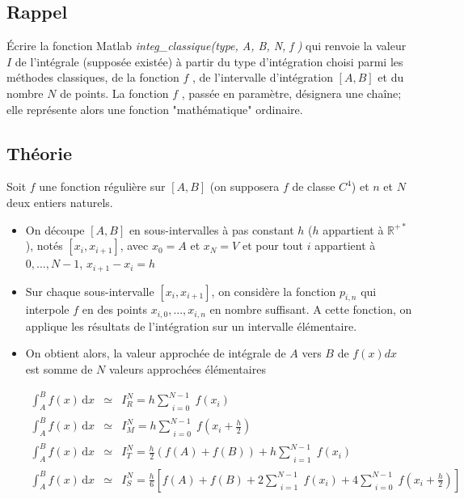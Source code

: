 \documentclass[a4paper,10pt]{report}
\newcommand{\R}{\mathbb{R}}
\begin{document}
\subsection*{Rappel}

Écrire la fonction Matlab \textit{integ\_classique(type, A, B, N, f )} qui renvoie la valeur $I$ de l’intégrale (supposée existée) à partir du type d’intégration choisi parmi les méthodes classiques, de la fonction $f$ , de l’intervalle d’intégration $[A, B]$ et du nombre $N$ de points. La fonction $f$ , passée en paramètre, désignera une chaîne; elle représente alors une fonction "mathématique" ordinaire.

\subsection*{Théorie}

Soit $f$ une fonction régulière sur $[A, B]$ (on supposera $f$ de classe $C^{4}$) et $n$ et $N$ deux entiers naturels.

\begin{itemize}
\item On découpe $[A, B]$ en sous-intervalles à pas constant $h$ ($h$ appartient à $\R^{+*}$), notés $[x_i, x_{i+1}]$, avec $x_0 = A$ et $x_N = V$ et pour tout $i$ appartient à ${0,...,N-1}$, $x_{i+1}-x_i = h$
\item Sur chaque sous-intervalle $[x_i, x_{i+1}]$, on considère la fonction $p_{i,n}$ qui interpole $f$ en des points ${x_{i,0} ,..., x_{i,n}}$ en nombre suffisant. A cette fonction, on applique les résultats de l’intégration sur un intervalle élémentaire.

\item On obtient alors, la valeur approchée de intégrale de $A$ vers $B$ de $f(x) dx$  est somme de $N$ valeurs approchées élémentaires

\begin{eqnarray}
\int_{A}^{B} f(x) \, \mathrm{d}x &\simeq& I^{N}_{R} = h \sum_{\substack{i=0}}^{N-1} f \left(x_i\right)\\
\int_{A}^{B} f(x) \, \mathrm{d}x &\simeq& I^{N}_{M} = h \sum_{\substack{i=0}}^{N-1} f \left(x_i + \frac{h}{2}\right)\\
\int_{A}^{B} f(x) \, \mathrm{d}x &\simeq& I^{N}_{T} = \frac{h}{2}(f(A)+f(B))+h \sum_{\substack{i=1}}^{N-1} f \left(x_i\right)\\
\int_{A}^{B} f(x) \, \mathrm{d}x &\simeq& I^{N}_{S} = \frac{h}{6}\left[f(A)+f(B)+2\sum_{\substack{i=1}}^{N-1}f(x_i) + 4\sum_{\substack{i=0}}^{N-1}f\left(x_i + \frac{h}{2}\right)\right]
\end{eqnarray}

\end{itemize}
\newpage
\end{document}
